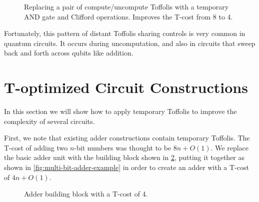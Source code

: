 \documentclass[twocolumn,longbibliography]{quantumarticle-customized}
\begin{document}
\begin{figure}
  \caption{
	Replacing a pair of compute/uncompute Toffolis with a temporary AND gate and Clifford operations.
	Improves the T-cost from 8 to 4.
  }
  \label{fig:paired-toffoli-to-logical-and}
\end{figure}

Fortunately, this pattern of distant Toffolis sharing controls is very common in quantum circuits.
It occurs during uncomputation, and also in circuits that sweep back and forth across qubits like addition.


\section{T-optimized Circuit Constructions}
\label{sec:circuit-constructions}

In this section we will show how to apply temporary Toffolis to improve the complexity of several circuits.

First, we note that existing adder constructions contain temporary Toffolis.
The T-cost of adding two $n$-bit numbers was thought to be $8n + O(1)$.
We replace the basic adder unit with the building block shown in \ref{fig:full-adder-block}, putting it together as shown in \ref{fig:multi-bit-adder-example} in order to create an adder with a T-cost of $4n + O(1)$.

\begin{figure}
  \caption{
	Adder building block with a T-cost of 4.
  }
  \label{fig:full-adder-block}
\end{figure}
\end{document}
